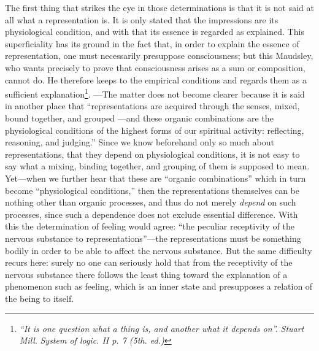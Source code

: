 \documentclass[12pt,a4paper,openany]{book}
\newcommand{\opage}[1]{\marginnote{\footnotesize\textit{[#1]}}}
\begin{document}
The first thing that strikes the eye in those determinations
is that it is not said at all what a representation is. It is
only stated that the impressions are its physiological condition,
and with that its essence is regarded as explained. This
superficiality has its ground in the fact that, in order to explain
the essence of representation, one must necessarily presuppose consciousness;
but this Maudsley, who wants precisely to prove that consciousness
arises as a sum or composition, cannot do.
He therefore keeps to the empirical conditions and regards
them as a sufficient explanation\footnote{\textit{``It is one question what a thing is, and another what it depends on''.} \emph{\textit{Stuart Mill}}. \textit{System of logic. II p. 7 (5th. ed.)}}. ---The matter does not become
clearer because it is said in another place that ``representations
are acquired through the senses, mixed, bound together, and grouped
---and these organic combinations are the physiological
\opage{318}conditions of the highest forms of our spiritual activity:
reflecting, reasoning, and judging.'' Since we
know beforehand only so much about representations, that they depend
on physiological conditions, it is not easy to say what a
mixing, binding together, and grouping of them is supposed to mean.
Yet---when we further hear that these are ``organic combinations''
which in turn become ``physiological conditions,'' then
the representations themselves can be nothing other than organic
processes, and thus do not merely \emph{depend} on such processes, since such a
dependence does not exclude essential difference. With this the determination
of feeling would agree: ``the peculiar
receptivity of the nervous substance to representations''---the representations must
be something bodily in order to be able to affect the nervous substance.
But the same difficulty recurs here: surely no one can
seriously hold that from the receptivity of the nervous substance
there follows the least thing toward the explanation of a phenomenon
such as feeling, which is an inner state and presupposes a
relation of the being to itself.
\end{document}
